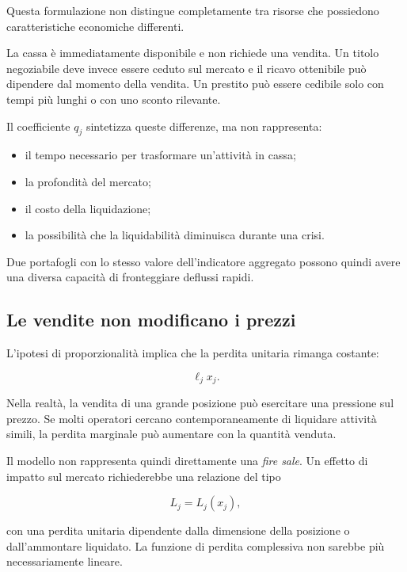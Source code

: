 Questa formulazione non distingue completamente tra risorse che possiedono
caratteristiche economiche differenti.

La cassa \`e immediatamente disponibile e non richiede una vendita. Un titolo
negoziabile deve invece essere ceduto sul mercato e il ricavo ottenibile pu\`o
dipendere dal momento della vendita. Un prestito pu\`o essere cedibile solo
con tempi pi\`u lunghi o con uno sconto rilevante.

Il coefficiente \(q_j\) sintetizza queste differenze, ma non rappresenta:

\begin{itemize}

\item il tempo necessario per trasformare un'attivit\`a in cassa;

\item la profondit\`a del mercato;

\item il costo della liquidazione;

\item la possibilit\`a che la liquidabilit\`a diminuisca durante una crisi.

\end{itemize}

Due portafogli con lo stesso valore dell'indicatore aggregato possono quindi
avere una diversa capacit\`a di fronteggiare deflussi rapidi.

\subsection{Le vendite non modificano i prezzi}

L'ipotesi di proporzionalit\`a implica che la perdita unitaria rimanga
costante:

\[
\ell_jx_j.
\]

Nella realt\`a, la vendita di una grande posizione pu\`o esercitare una
pressione sul prezzo. Se molti operatori cercano contemporaneamente di
liquidare attivit\`a simili, la perdita marginale pu\`o aumentare con la
quantit\`a venduta.

Il modello non rappresenta quindi direttamente una \emph{fire sale}. Un
effetto di impatto sul mercato richiederebbe una relazione del tipo

\[
L_j=L_j(x_j),
\]

\noindent con una perdita unitaria dipendente dalla dimensione della posizione o
dall'ammontare liquidato. La funzione di perdita complessiva non sarebbe pi\`u
necessariamente lineare.

